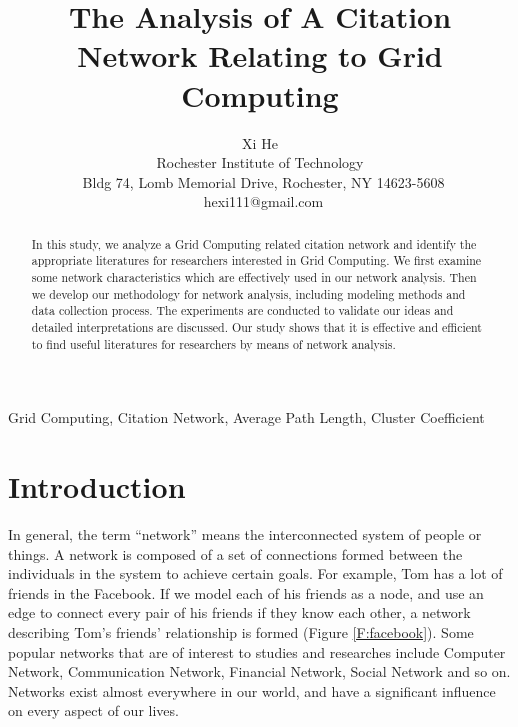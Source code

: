
\newcommand{\GVL}[1]{{\color{red}\em  GVL: #1}}
\newcommand{\E}[1]{{\color{red}~\blacksquare~\footnote{grammar, spelling, sentence, or other error}~}}

\newcommand{\SHELL}{GridShell}
\newcommand{\AUTHOR}{%
Xi He\\
Rochester Institute of Technology\\
~Bldg 74, Lomb Memorial Drive, Rochester, NY 14623-5608 \\
~hexi111@gmail.com%
}
\newcommand{\TITLE}{The Analysis of A Citation Network Relating to Grid Computing }


\title{\TITLE}
\author{\AUTHOR}

\maketitle

\begin{abstract}
In this study, we analyze a Grid Computing related citation network and identify the appropriate literatures for researchers interested in Grid Computing. We first examine some network characteristics which are effectively used in our network analysis. Then we develop our methodology for network analysis, including modeling methods and data collection process. The experiments are conducted to validate our ideas and detailed interpretations are discussed. Our study shows that it is effective and efficient to find useful literatures for researchers by means of network analysis.
\end{abstract}
\begin{keywords}
Grid Computing, Citation Network, Average Path Length, Cluster Coefficient
\end{keywords}
\section{Introduction}

In general, the term ``network'' means the interconnected system of people or things. A network is composed of a set of connections formed between the individuals in the system to achieve certain goals. For example, Tom has a lot of friends in the Facebook. If we model each of his friends as a node, and use an edge to connect every pair of his friends if they know each other,  a network describing Tom's friends' relationship is formed (Figure \ref{F:facebook}). Some popular networks that are of interest to studies and researches include Computer Network, Communication Network, Financial Network, Social Network and so on.  Networks exist almost everywhere in our world, and have a significant influence on every aspect of our lives.  

